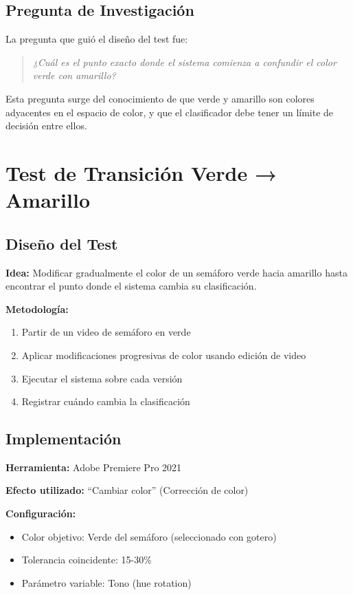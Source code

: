 \subsection{Pregunta de Investigación}

La pregunta que guió el diseño del test fue:

\begin{quote}
\textit{¿Cuál es el punto exacto donde el sistema comienza a confundir el color verde con amarillo?}
\end{quote}

Esta pregunta surge del conocimiento de que verde y amarillo son colores adyacentes en el espacio de color, y que el clasificador debe tener un límite de decisión entre ellos.

\section{Test de Transición Verde → Amarillo}

\subsection{Diseño del Test}

\textbf{Idea:} Modificar gradualmente el color de un semáforo verde hacia amarillo hasta encontrar el punto donde el sistema cambia su clasificación.

\textbf{Metodología:}

\begin{enumerate}
    \item Partir de un video de semáforo en verde
    \item Aplicar modificaciones progresivas de color usando edición de video
    \item Ejecutar el sistema sobre cada versión
    \item Registrar cuándo cambia la clasificación
\end{enumerate}

\subsection{Implementación}

\textbf{Herramienta:} Adobe Premiere Pro 2021

\textbf{Efecto utilizado:} ``Cambiar color'' (Corrección de color)

\textbf{Configuración:}
\begin{itemize}
    \item Color objetivo: Verde del semáforo (seleccionado con gotero)
    \item Tolerancia coincidente: 15-30\%
    \item Parámetro variable: Tono (hue rotation)
\end{itemize}

